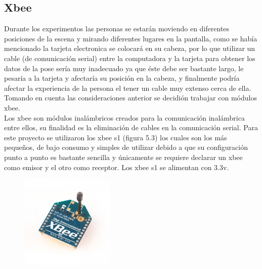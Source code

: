         \subsection{Xbee}
        Durante los experimentos las personas se estarán moviendo en diferentes posiciones de la escena y mirando diferentes lugares en la pantalla, como se había mencionado la tarjeta electronica se colocará en su cabeza, por lo que utilizar un cable (de comunicación serial) entre la computadora y la tarjeta para obtener los datos de la pose sería muy inadecuado ya que éste debe ser bastante largo, le pesaría a la tarjeta y afectaría su posición en la cabeza, y finalmente podría afectar la experiencia de la persona el tener un cable muy extenso cerca de ella. Tomando en cuenta las consideraciones anterior se decidión trabajar con módulos xbee.\\
        Los xbee son módulos inalámbricos creados para la comunicación inalámbrica entre ellos, su finalidad es la eliminación de cables en la comunicación serial. Para este proyecto se utilizaron los xbee s1 (figura 5.3) los cuales son los más  pequeños, de bajo consumo y simples de utilizar debido a que su configuración punto a punto es bastante sencilla y únicamente se requiere declarar un xbee como emisor y el otro como receptor. Los xbee s1 se alimentan con 3.3v.
        
        \begin{figure}[htbp]
        	\centering
        	\includegraphics[width=0.4\textwidth]{./pictures/xbee}
        	\caption{}\label{fig: figura}
        \end{figure}
        
